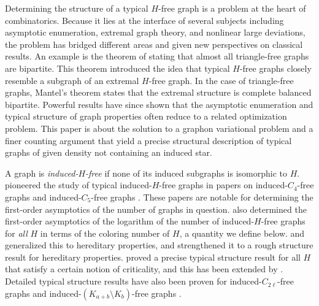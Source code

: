 Determining the structure of a typical $H$-free graph is a problem at the heart of combinatorics.
Because it lies at the interface of several subjects including asymptotic enumeration, extremal graph theory, and nonlinear large deviations, the problem has bridged different areas and given new perspectives on classical results.
An example is the \citeyear{erdos1976enumeration} theorem of \citeauthor{erdos1976enumeration} \cite{erdos1976enumeration} stating that almost all triangle-free graphs are bipartite. This theorem introduced the idea that typical $H$-free graphs closely resemble a subgraph of an extremal $H$-free graph. In the case of triangle-free graphs, Mantel's theorem \cite{mantel1907vraagstuk} states that the extremal structure is complete balanced bipartite.
Powerful results have since shown that the asymptotic enumeration and typical structure of graph properties often reduce to a related optimization problem. This paper is about the solution to a graphon variational problem and a finer counting argument that yield a precise structural description of typical graphs of given density not containing an induced star.

A graph is \emph{induced-$H$-free} if none of its induced subgraphs is isomorphic to $H$. \citeauthor{promel1991excluding} pioneered the study of typical induced-$H$-free graphs in papers on induced-$C_4$-free graphs \cite{promel1991excluding} and induced-$C_5$-free graphs \cite{promel1992almost}. These papers are notable for determining the first-order asymptotics of the number of graphs in question. \citeauthor{promel1992excluding} \cite{promel1992excluding} also determined the first-order asymptotics of the logarithm of the number of induced-$H$-free graphs for \emph{all} $H$ in terms of the coloring number of $H$, a quantity we define below. \citeauthor{alekseev1993entropy} \cite{alekseev1993entropy} and \citeauthor{bollobas1997hereditary} \cite{bollobas1997hereditary} generalized this to hereditary properties, and \citeauthor{alon2011structure} \cite{alon2011structure} strengthened it to a rough structure result for hereditary properties. \citeauthor{balogh2011excluding} \cite{balogh2011excluding} proved a precise typical structure result for all $H$ that satisfy a certain notion of criticality, and this has been extended by \citeauthor{norin2025typicalI} \cite{norin2025typicalI,norin2025typicalII}. Detailed typical structure results have also been proven for induced-$C_{2\ell}$-free graphs \cite{kim2018forbidding} and induced-$(K_{a+b}\setminus K_b)$-free graphs \cite{keevash2017structure}.

